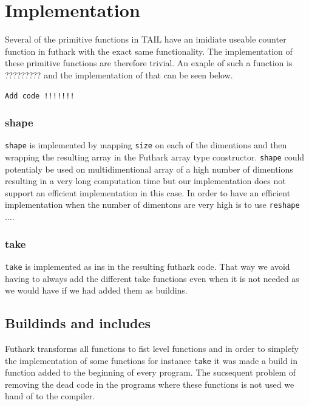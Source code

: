 \documentclass[11pt]{article}
\begin{document}
\section{Implementation}
Several of the primitive functions in TAIL have an imidiate useable counter function in futhark with the exact same functionality. The implementation of these primitive functions are therefore trivial. An exaple of such a function is ????????? and the implementation of that can be seen below. 

\begin{lstlisting}
Add code !!!!!!!
\end{lstlisting}



\subsubsection{shape}
\verb|shape| is implemented by mapping \verb|size| on each of the dimentions and then wrapping the resulting array in the Futhark array type constructor. 
\verb|shape| could potentialy be used on multidimentional array of a high number of dimentions resulting in a very long computation time but our implementation does not support an efficient implementation in this case. In order to have an efficient implementation when the number of dimentons are very high is to use \verb|reshape| .... \\

\subsubsection{take}
\verb|take| is implemented as ins in the resulting futhark code. That way we avoid having to always add the different take functions even when it is not needed as we would have if we had added them as buildins. 

\subsection{Buildinds and includes}
Futhark transforms all functions to fist level functions and in order to simplefy the implementation of some functions for instance \verb|take| it was made a build in function added to the beginning of every program. The sucsequent problem of removing the dead code in the programs where these functions is not used we hand of to the compiler.


\end{document}
